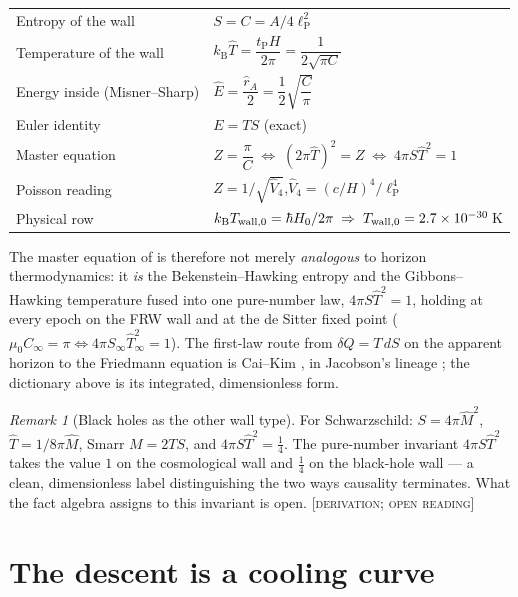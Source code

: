 \documentclass[11pt,reqno]{amsart}
\numberwithin{equation}{section}
\theoremstyle{definition}
\theoremstyle{remark}
\newtheorem{remark}[theorem]{Remark}
\newcommand{\slab}[1]{\textup{[\textsc{#1}]}}
\newcommand{\lP}{\ell_{\mathrm P}}
\newcommand{\tP}{t_{\mathrm P}}
\newcommand{\kB}{k_{\mathrm B}}
\begin{document}
\begin{center}
\begin{tabular}{@{}ll@{}}
\toprule
Entropy of the wall & $S=C=A/4\lP^2$\\[2pt]
Temperature of the wall & $\kB\hat T=\dfrac{\tP H}{2\pi}=\dfrac{1}{2\sqrt{\pi C}}$\\[6pt]
Energy inside (Misner--Sharp) & $\hat E=\dfrac{\hat r_A}{2}=\dfrac12\sqrt{\dfrac{C}{\pi}}$\\[6pt]
Euler identity & $E=TS$ \quad(exact)\\[2pt]
Master equation & $Z=\dfrac{\pi}{C}\;\Longleftrightarrow\;(2\pi\hat T)^2=Z
\;\Longleftrightarrow\;\boxed{4\pi S\hat T^2=1}$\\[6pt]
Poisson reading & $Z=1/\sqrt{\hat V_4}$,\quad $\hat V_4=(c/H)^4/\lP^4$\\[2pt]
Physical row & $\kB T_{\rm wall,0}=\hbar H_0/2\pi
\;\Rightarrow\;T_{\rm wall,0}=2.7\times10^{-30}\,$K\\
\bottomrule
\end{tabular}
\end{center}

\smallskip
The master equation of \cite{Ruble2026a} is therefore not merely
\emph{analogous} to horizon thermodynamics: it \emph{is} the
Bekenstein--Hawking entropy and the Gibbons--Hawking temperature fused
into one pure-number law, $4\pi S\hat T^2=1$, holding at every epoch on
the FRW wall and at the de Sitter fixed point
($\mu_0C_\infty=\pi\Leftrightarrow4\pi S_\infty\hat T_\infty^2=1$). The
first-law route from $\delta Q=T\,dS$ on the apparent horizon to the
Friedmann equation is Cai--Kim \cite{CaiKim2005}, in Jacobson's lineage
\cite{Jacobson1995}; the dictionary above is its integrated,
dimensionless form.

\begin{remark}[Black holes as the other wall type]
For Schwarzschild: $S=4\pi\hat M^2$, $\hat T=1/8\pi\hat M$, Smarr
$M=2TS$, and $4\pi S\hat T^2=\tfrac14$. The pure-number invariant
$4\pi S\hat T^2$ takes the value $1$ on the cosmological wall and
$\tfrac14$ on the black-hole wall --- a clean, dimensionless label
distinguishing the two ways causality terminates. What the fact algebra
assigns to this invariant is open. \slab{derivation; open reading}
\end{remark}

\section{The descent is a cooling curve}\label{sec:cooling}
\end{document}
